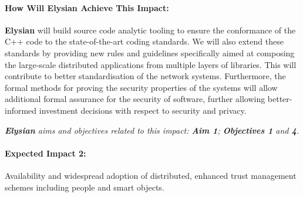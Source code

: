 \documentclass[a4paper,11pt]{article}
\newcommand{\project}[1]{\textbf{#1}\xspace}
\newcommand{\SECURITY}{\project{Elysian}}
\newcommand{\TheProject}{\SECURITY}
\begin{document}
\begin{mdframed}[backgroundcolor=gray!10]
\paragraph{How Will \TheProject{} Achieve This Impact:}
\TheProject{} will build source code analytic tooling to ensure the conformance of the C++ code to the state-of-the-art coding standards. We will also extend these standards  by providing new rules and guidelines specifically aimed at composing the large-scale distributed applications from multiple layers of libraries. This will contribute to better standardisation of the network systems. Furthermore, the formal methods for proving the security properties of the systems will allow additional formal assurance for the security of software, further allowing better-informed investment decisions with respect to security and privacy.

\emph{\TheProject{} aims and objectives related to this impact: \textbf{Aim 1}; \textbf{Objectives 1} and \textbf{4}.}

\end{mdframed}

\begin{mdframed}[backgroundcolor=blue!5]
\paragraph{Expected Impact 2:}
Availability and widespread adoption of distributed, enhanced trust management schemes including people and smart objects.
\end{mdframed}
\end{document}
